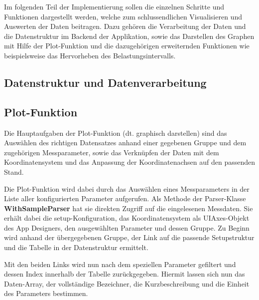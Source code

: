 Im folgenden Teil der Implementierung sollen die einzelnen Schritte und Funktionen dargestellt werden, welche zum schlussendlichen Visualisieren und Auswerten der Daten beitragen. Dazu gehören die Verarbeitung der Daten und die Datenstruktur im Backend der Applikation, sowie das Darstellen des Graphen mit Hilfe der Plot-Funktion und die dazugehörigen erweiternden Funktionen wie beispielsweise das Hervorheben des Belastungsintervalls.

\subsection{Datenstruktur und Datenverarbeitung}




\subsection{Plot-Funktion}

Die Hauptaufgaben der Plot-Funktion (dt. graphisch darstellen) sind das Auswählen des richtigen Datensatzes anhand einer gegebenen Gruppe und dem zugehörigen Messparameter, sowie das Verknüpfen der Daten mit dem Koordinatensystem und das Anpassung der Koordinatenachsen auf den passenden Stand.

Die Plot-Funktion wird dabei durch das Auswählen eines Messparameters in der Liste aller konfigurierten Parameter aufgerufen. Als Methode der Parser-Klasse \textbf{WithSampleParser} hat sie direkten Zugriff auf die eingelesenen Messdaten. Sie erhält dabei die setup-Konfiguration, das Koordinatensystem als UIAxes-Objekt des App Designers, den ausgewählten Parameter und dessen Gruppe. Zu Beginn wird anhand der übergegebenen Gruppe, der Link auf die passende Setupstruktur und die Tabelle in der Datenstruktur ermittelt.



Mit den beiden Links wird nun nach dem speziellen Parameter gefiltert und dessen Index innerhalb der Tabelle zurückgegeben. Hiermit lassen sich nun das Daten-Array, der vollständige Bezeichner, die Kurzbeschreibung und die Einheit des Parameters bestimmen. 



